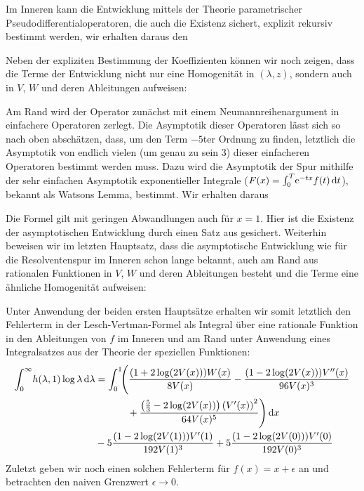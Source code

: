 Im Inneren kann die Entwicklung mittels der Theorie parametrischer
Pseudodifferentialoperatoren, die auch die Existenz sichert, explizit rekursiv
bestimmt werden, wir erhalten daraus den 
\begin{Hauptsatz}
  
\end{Hauptsatz}
Neben der expliziten Bestimmung der Koeffizienten können wir noch zeigen, dass
die Terme der Entwicklung nicht nur eine Homogenität in $(\lambda,z)$, sondern
auch in $V$, $W$ und deren Ableitungen aufweisen:
\begin{Hauptsatz}
  
\end{Hauptsatz}
Am Rand wird der Operator zunächst mit einem Neumannreihenargument in
einfachere Operatoren zerlegt. Die Asymptotik dieser Operatoren lässt sich so nach
oben abschätzen, dass, um den Term $-5$ter Ordnung zu finden, letztlich die
Asymptotik von endlich vielen (um genau zu sein 3) dieser einfacheren Operatoren
bestimmt werden muss. Dazu wird die Asymptotik der Spur mithilfe der sehr
einfachen Asymptotik exponentieller Integrale ($F(x) =
\Integ[T]{0}{t}{\Eto{-tx}f(t)}$), bekannt als Watsons Lemma, bestimmt. Wir
erhalten daraus
\begin{Hauptsatz}
  
\end{Hauptsatz}
Die Formel gilt mit geringen Abwandlungen auch für $x=1$. Hier ist die Existenz
der asymptotischen Entwicklung durch einen Satz aus \cite{LV13} gesichert.
Weiterhin beweisen wir im letzten Hauptsatz, dass die asymptotische
Entwicklung wie für die Resolventenspur im Inneren schon lange bekannt, auch am
Rand aus rationalen Funktionen in $V$, $W$ und deren Ableitungen besteht und die
Terme eine ähnliche Homogenität aufweisen:
\begin{Hauptsatz}
  
\end{Hauptsatz}

Unter Anwendung der beiden ersten Hauptsätze erhalten wir somit letztlich den
Fehlerterm in der Lesch-Vertman-Formel als Integral über eine rationale Funktion
in den Ableitungen von $f$ im Inneren und am Rand unter Anwendung eines
Integralsatzes aus der Theorie der speziellen Funktionen:
\begin{align*}
  \Integ[\infty]{0}{\lambda}{
    h(\lambda, 1) \log\lambda
  }
  &=
  \Int{x}{\Biggl(\frac{(1 + 2 \log(2 V(x))) W(x)}{8 V(x)}
    - \frac{ (1 - 2 \log(2 V(x)))V''(x)}{96 V(x)^{3}} \\
    &\hphantom{=\int_0^1\Biggl(}\mathbin{+} \frac{\left(\frac{5}{3} - 2\log(2
    V(x))\right)\left(V'(x)\right)^{2}}{64 V(x)^{5}}\Biggr) } \\
&\mathbin- 5\frac{(1 - 2\log(2 V(1)))V'(1)}{192 V(1)^3}
+ 5\frac{(1 - 2 \log(2 V(0)))V'(0)}{192 V(0)^3}
\end{align*}
Zuletzt geben wir noch einen solchen Fehlerterm für $f(x) = x + \epsilon$ an und
betrachten den naiven Grenzwert $\epsilon \to 0$.
